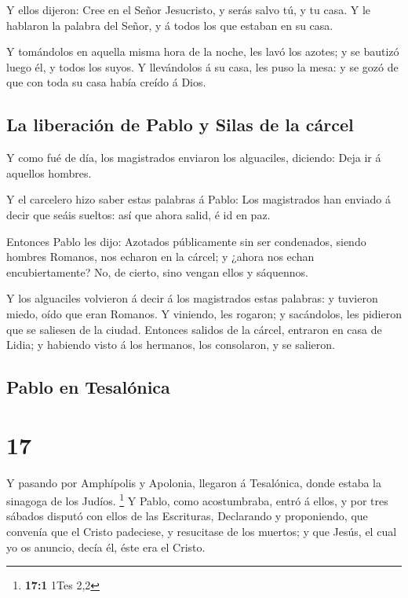  Y ellos dijeron: Cree en el Señor Jesucristo, y serás
salvo tú, y tu casa.  Y le hablaron la palabra del Señor, y
á todos los que estaban en su casa.

 Y tomándolos en aquella misma hora de la noche, les lavó
los azotes; y se bautizó luego él, y todos los suyos.  Y
llevándolos á su casa, les puso la mesa: y se gozó de que con toda su
casa había creído á Dios.

\hypertarget{la-liberaciuxf3n-de-pablo-y-silas-de-la-cuxe1rcel}{%
\subsection{La liberación de Pablo y Silas de la
cárcel}\label{la-liberaciuxf3n-de-pablo-y-silas-de-la-cuxe1rcel}}

 Y como fué de día, los magistrados enviaron los
alguaciles, diciendo: Deja ir á aquellos hombres.

 Y el carcelero hizo saber estas palabras á Pablo: Los
magistrados han enviado á decir que seáis sueltos: así que ahora salid,
é id en paz.

 Entonces Pablo les dijo: Azotados públicamente sin ser
condenados, siendo hombres Romanos, nos echaron en la cárcel; y ¿ahora
nos echan encubiertamente? No, de cierto, sino vengan ellos y sáquennos.

 Y los alguaciles volvieron á decir á los magistrados estas
palabras: y tuvieron miedo, oído que eran Romanos.  Y
viniendo, les rogaron; y sacándolos, les pidieron que se saliesen de la
ciudad.  Entonces salidos de la cárcel, entraron en casa de
Lidia; y habiendo visto á los hermanos, los consolaron, y se salieron.

\hypertarget{pablo-en-tesaluxf3nica}{%
\subsection{Pablo en Tesalónica}\label{pablo-en-tesaluxf3nica}}

\hypertarget{section-16}{%
\section{17}\label{section-16}}

 Y pasando por Amphípolis y Apolonia, llegaron á Tesalónica,
donde estaba la sinagoga de los Judíos. \footnote{\textbf{17:1} 1Tes 2,2}
 Y Pablo, como acostumbraba, entró á ellos, y por tres
sábados disputó con ellos de las Escrituras,  Declarando y
proponiendo, que convenía que el Cristo padeciese, y resucitase de los
muertos; y que Jesús, el cual yo os anuncio, decía él, éste era el
Cristo.

